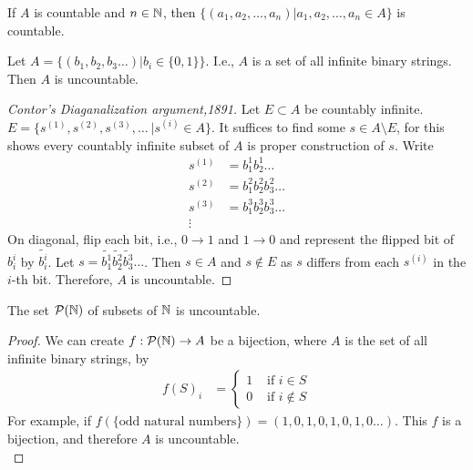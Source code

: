 \begin{corollary}
	If $A$ is countable and $n \in \mathbb{N} $, then $\{(a_1,a_2, \ldots ,a_n)| a_1,a_2, \ldots , a_n \in A  \} $ is countable.
\end{corollary}


\begin{thm}[14]
	Let $A= \{(b_1,b_2,b_3 \ldots )| b_i \in \{0,1\} \}$. I.e., $A$ is a set of all infinite binary strings.
	Then $A$ is uncountable.
	\begin{proof}[Contor's Diaganalization argument,1891]
		Let $E \subset A$ be countably infinite. $E=\{s^{(1)},s^{(2)},s^{(3)}, \ldots\ | s^{(i)} \in A\} $.
		It suffices to find some $s \in A \setminus E$, for this shows every countably infinite subset of $A$ is proper construction of $s$.
		Write
		\begin{align}
			s^{(1)} & = b_1^{1}b_2^{1} \ldots       \\
			s^{(2)} & =b^{2}_1b^{2}_2b^{2}_3 \ldots \\
			s^{(3)} & =b^{3}_1b^{3}_2b^{3}_3 \ldots \\
			\vdots  & \nonumber
		\end{align}
		On diagonal, flip each bit, i.e., $0\to 1$ and $1\to 0$ and represent the flipped bit of $b_i^{i}$ by $\tilde{b_i^{i}}$.
		Let $s=\tilde{b_1^{1}}\tilde{b_2^{2}}\tilde{b_3^{3}}\ldots$.
		Then $s \in A$ and $s \notin E$ as $s$ differs from each $s^{(i)}$ in the $i$-th bit. Therefore, $A$ is uncountable.
	\end{proof}
\end{thm}

\begin{corollary}
	The set $\mathcal{P}(\mathbb{N})$ of subsets of $\mathbb{N} $ is uncountable.
	\begin{proof}
		We can create $f: \mathcal{P}(\mathbb{N}) \to A$ be a bijection, where $A$ is the set of all infinite binary strings, by
		\begin{align}
			f(S)_i & = \begin{cases}
				           1 & \text{ if $i \in S$}    \\
				           0 & \text{ if $i \notin S$}
			           \end{cases}
		\end{align}
		For example, if $f(\{\text{odd natural numbers}\})= (1,0,1,0,1,0,1,0\ldots)$.
		This $f$ is a bijection, and therefore $A$ is uncountable.\\
	\end{proof}
\end{corollary}

